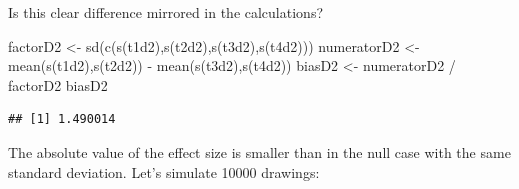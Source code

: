 \documentclass[
  10pt,
  dvipsnames,enabledeprecatedfontcommands]{scrartcl}
\newenvironment{Shaded}{\begin{snugshade}}{\end{snugshade}}
\newcommand{\FunctionTok}[1]{\textcolor[rgb]{0.00,0.00,0.00}{#1}}
\newcommand{\NormalTok}[1]{#1}
\newcommand{\OtherTok}[1]{\textcolor[rgb]{0.56,0.35,0.01}{#1}}
\newcommand{\SpecialCharTok}[1]{\textcolor[rgb]{0.00,0.00,0.00}{#1}}
\begin{document}
\noindent  Is this clear difference mirrored in the calculations?

\footnotesize

\begin{Shaded}
\begin{Highlighting}[]
\NormalTok{factorD2 }\OtherTok{\textless{}{-}} \FunctionTok{sd}\NormalTok{(}\FunctionTok{c}\NormalTok{(}\FunctionTok{s}\NormalTok{(t1d2),}\FunctionTok{s}\NormalTok{(t2d2),}\FunctionTok{s}\NormalTok{(t3d2),}\FunctionTok{s}\NormalTok{(t4d2)))}
\NormalTok{numeratorD2 }\OtherTok{\textless{}{-}}  \FunctionTok{mean}\NormalTok{(}\FunctionTok{s}\NormalTok{(t1d2),}\FunctionTok{s}\NormalTok{(t2d2)) }\SpecialCharTok{{-}} \FunctionTok{mean}\NormalTok{(}\FunctionTok{s}\NormalTok{(t3d2),}\FunctionTok{s}\NormalTok{(t4d2))}
\NormalTok{biasD2 }\OtherTok{\textless{}{-}}\NormalTok{ numeratorD2 }\SpecialCharTok{/}\NormalTok{ factorD2}
\NormalTok{biasD2}
\end{Highlighting}
\end{Shaded}

\begin{verbatim}
## [1] 1.490014
\end{verbatim}

\normalsize

\noindent The absolute value of the effect size is smaller than in the
null case with the same standard deviation. Let's simulate 10000
drawings:

\vspace{1mm}
\footnotesize
\end{document}
